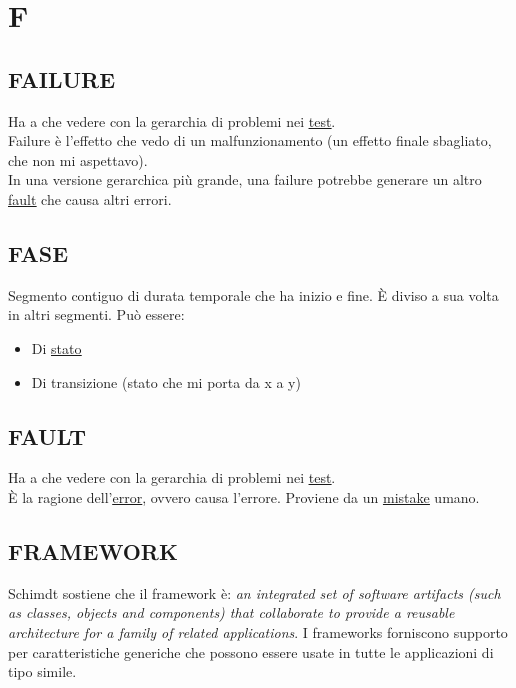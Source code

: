 \newpage
	\section{F} \label{sec:F}

		\subsection{FAILURE}		\label{failure}	%
		Ha a che vedere con la gerarchia di problemi nei \underline{\hyperref[test]{test}}. \\
		Failure è l'effetto che vedo di un malfunzionamento (un effetto finale sbagliato, che non mi aspettavo). \\
		In una versione gerarchica più grande, una failure potrebbe generare un altro \underline{\hyperref[fault]{fault}} che causa altri errori. %


		\subsection{FASE}  \label{fase}
		Segmento contiguo di durata temporale che ha inizio e fine. È diviso a sua volta in altri segmenti. Può essere:
		\begin{itemize}
			\item Di \underline{\hyperref[stato]{stato}}
			\item Di transizione (stato che mi porta da x a y)
		\end{itemize}


		\subsection{FAULT}		\label{fault}
		Ha a che vedere con la gerarchia di problemi nei \underline{\hyperref[test]{test}}. \\
		È la ragione dell'\underline{\hyperref[error]{error}}, ovvero causa l'errore. Proviene da un \underline{\hyperref[mistake]{mistake}} umano.

		\subsection{FRAMEWORK}	 \label{framework}
		Schimdt sostiene che il framework è: \textit{an integrated set of software artifacts (such as classes, objects and components) that collaborate to provide a reusable architecture for a family of related applications}. I frameworks forniscono supporto per caratteristiche generiche che possono essere usate in tutte le applicazioni di tipo simile.

